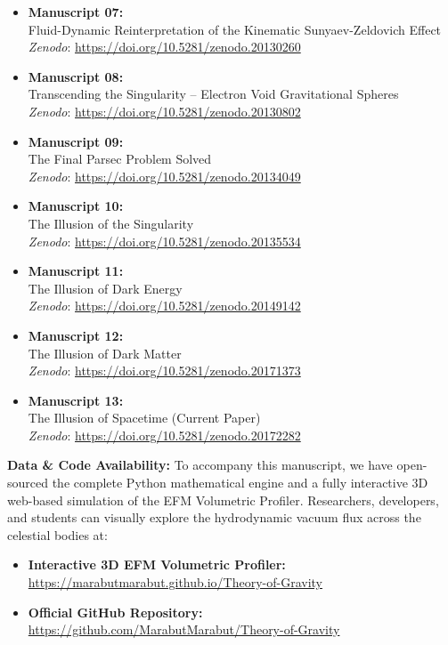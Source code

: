 \documentclass[11pt, a4paper, table]{article}
\begin{document}
\begin{itemize}
    \item \textbf{Manuscript 07:} \\ Fluid-Dynamic Reinterpretation of the Kinematic Sunyaev-Zeldovich Effect \\ \textit{Zenodo}: \url{https://doi.org/10.5281/zenodo.20130260}

    \item \textbf{Manuscript 08:} \\ Transcending the Singularity -- Electron Void Gravitational Spheres \\ \textit{Zenodo}: \url{https://doi.org/10.5281/zenodo.20130802}

    \item \textbf{Manuscript 09:} \\ The Final Parsec Problem Solved \\ \textit{Zenodo}: \url{https://doi.org/10.5281/zenodo.20134049}

    \item \textbf{Manuscript 10:} \\ The Illusion of the Singularity \\ \textit{Zenodo}: \url{https://doi.org/10.5281/zenodo.20135534}
    
    \item \textbf{Manuscript 11:} \\ The Illusion of Dark Energy \\ \textit{Zenodo}: \url{https://doi.org/10.5281/zenodo.20149142}
    
    \item \textbf{Manuscript 12:} \\ The Illusion of Dark Matter \\ \textit{Zenodo}: \url{https://doi.org/10.5281/zenodo.20171373}

    \item \textbf{Manuscript 13:} \\ The Illusion of Spacetime (Current Paper) \\ \textit{Zenodo}: \url{https://doi.org/10.5281/zenodo.20172282}
  \end{itemize}

  \vspace{1em}
  \noindent \textbf{Data \& Code Availability:} To accompany this manuscript, we have open-sourced the complete Python mathematical engine and a fully interactive 3D web-based simulation of the EFM Volumetric Profiler. Researchers, developers, and students can visually explore the hydrodynamic vacuum flux across the celestial bodies at: 
  \begin{itemize}
    \item \textbf{Interactive 3D EFM Volumetric Profiler:} \\ \url{https://marabutmarabut.github.io/Theory-of-Gravity}
    
    \item \textbf{Official GitHub Repository:} \\ \url{https://github.com/MarabutMarabut/Theory-of-Gravity}
  \end{itemize}
  
\end{document}
